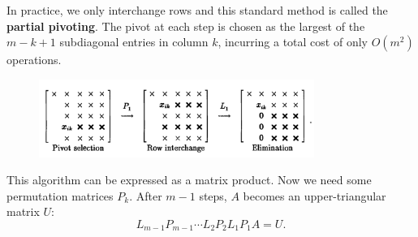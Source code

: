 In practice, we only interchange rows and this standard method is called the \textbf{partial pivoting}. The pivot at each step is chosen as the largest of the $m-k+1$ subdiagonal entries in column $k$, incurring a total cost of only $O(m^2)$ operations.  
\begin{figure}[H]
    \centering
    \includegraphics[width=0.8\textwidth]{figures/21-4.png}
\end{figure}
This algorithm can be expressed as a matrix product. Now we need some permutation matrices $P_k$. After $m-1$ steps, $A$ becomes an upper-triangular matrix $U$: 
\begin{equation}
\label{eq: pivot C}
L_{m-1} P_{m-1} \cdots L_2 P_2 L_1 P_1 A=U. 
\end{equation}

